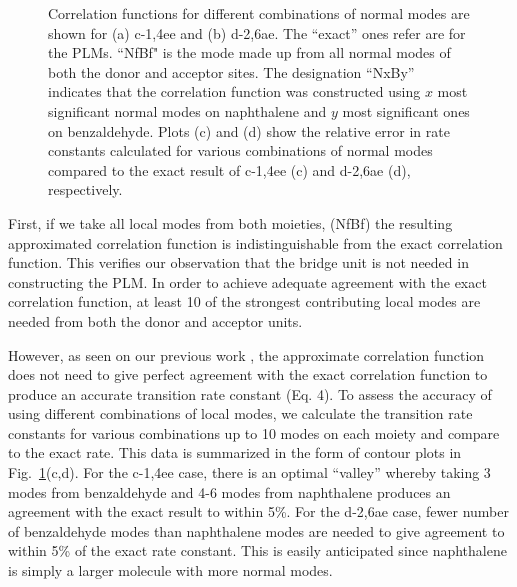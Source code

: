 \begin{figure}[!h]
\caption{Correlation functions for different combinations of normal modes are shown for (a) c-1,4ee and (b) d-2,6ae.  The ``exact'' ones refer are for the PLMs.  ``NfBf"
is the mode made up from all normal modes of both the donor and acceptor sites.
The designation ``NxBy'' indicates that the correlation function was constructed using  $x$ most significant normal modes
on naphthalene and $y$ most significant ones on benzaldehyde.   Plots (c) and (d) show the
 relative error in rate constants calculated for various combinations of normal modes compared to the exact result
 of c-1,4ee (c) and d-2,6ae (d), respectively. \label{backCorr}}
\end{figure}


 First, if we take all local modes from both moieties, (NfBf)
 the resulting approximated correlation function is indistinguishable from the exact correlation function.
This verifies our observation that the bridge unit is not needed in constructing the
PLM.
In order to achieve adequate agreement with the exact correlation function,
at least 10 of the strongest contributing local modes are needed from both the donor and acceptor units.

However, as seen on our previous work \cite{yang2014intramolecular},
the approximate correlation function does not need to give perfect agreement
with the exact correlation function to produce an accurate transition rate constant (Eq. 4).
To assess the accuracy of using different combinations of local modes,
we calculate the transition rate constants for various combinations up to 10 modes on
each moiety and compare to the exact rate.
This data is summarized in the form of contour plots in  Fig.~\ref{backCorr}(c,d).
For the c-1,4ee case, there is an optimal ``valley'' whereby taking 3 modes from benzaldehyde and 4-6 modes from
naphthalene produces an agreement with the exact result to within 5\%.
For the d-2,6ae case,  fewer number of benzaldehyde modes than naphthalene modes are needed to
give agreement to within 5\% of the exact rate constant.   This is easily anticipated since
naphthalene is simply a larger molecule with more normal modes.


